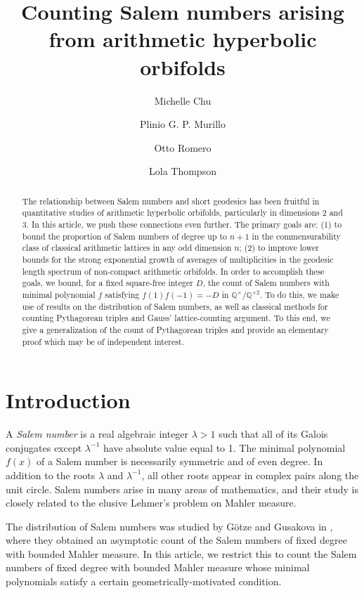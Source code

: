 \documentclass[12pt]{amsart}
\title{Counting Salem numbers arising from arithmetic hyperbolic orbifolds}
\author[M. Chu]{Michelle Chu}
\author[P. G. P. Murillo]{Plinio G. P. Murillo}
\author[O. Romero]{Otto Romero}
\author[L. Thompson]{Lola Thompson}
\newcommand{\Q}{\mathbb{Q}}
\theoremstyle{plain}
\begin{document}
\begin{abstract}
The relationship between Salem numbers and short geodesics has been fruitful in quantitative studies of arithmetic hyperbolic orbifolds, particularly in dimensions 2 and 3. In this article, we push these connections even further. The primary goals are: (1) to bound the proportion of Salem numbers of degree up to $n+1$ in the commensurability class of classical arithmetic lattices in any odd dimension $n$; (2) to improve lower bounds for the strong exponential growth of averages of multiplicities in the geodesic length spectrum of non-compact arithmetic orbifolds. In order to accomplish these goals, we bound, for a fixed square-free integer $D$, the count of Salem numbers with minimal polynomial $f$ satisfying $f(1)f(-1)=-D$ in $\Q^{\times}/\Q^{\times 2}$. To do this, we make use of results on the distribution of Salem numbers, as well as classical methods for counting Pythagorean triples and Gauss' lattice-counting argument. To this end, we give a generalization of the count of Pythagorean triples and provide an elementary proof which may be of independent interest.
\end{abstract}



\maketitle

\section{Introduction}\label{s:intro}

A \emph{Salem number} is a real algebraic integer $\lambda>1$ such that all of its Galois conjugates except $\lambda^{-1}$ have absolute value equal to 1. The minimal polynomial $f(x)$ of a Salem number is necessarily symmetric and of even degree. In addition to the roots $\lambda$ and $\lambda^{-1}$, all other roots appear in complex pairs along the unit circle. 
Salem numbers arise in many areas of mathematics, and their study is closely related to the elusive Lehmer's problem on Mahler measure. 

The distribution of Salem numbers was studied by G{\"o}tze and Gusakova in \cite{GG20}, where they obtained an asymptotic count of the Salem numbers of fixed degree with bounded Mahler measure. In this article, we restrict this to count the Salem numbers of fixed degree with bounded Mahler measure whose minimal polynomials satisfy a certain geometrically-motivated condition.
\end{document}

